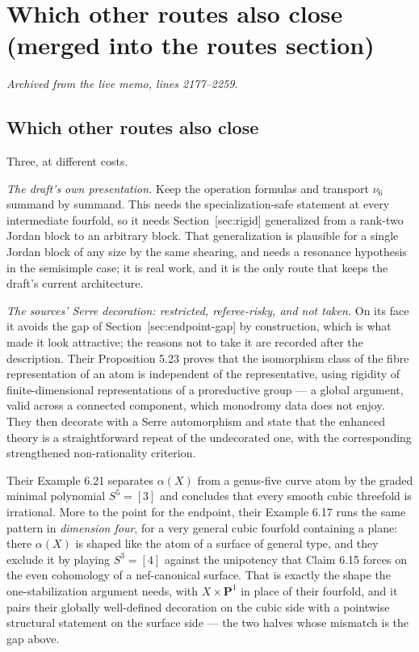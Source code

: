 \documentclass[11pt]{article}
\theoremstyle{definition}
\theoremstyle{remark}
\newcommand{\PP}{\mathbf P}
\begin{document}
\section{Which other routes also close (merged into the routes section)}
\noindent\emph{Archived from the live memo, lines 2177--2259.}

\subsection*{Which other routes also close}

Three, at different costs.

\emph{The draft's own presentation.} Keep the operation formulas and transport
$\nu_6$ summand by summand. This needs the specialization-safe statement at
every intermediate fourfold, so it needs Section~\textup{[sec:rigid]} generalized
from a rank-two Jordan block to an arbitrary block. That generalization is
plausible for a single Jordan block of any size by the same shearing, and needs
a resonance hypothesis in the semisimple case; it is real work, and it is the
only route that keeps the draft's current architecture.

\emph{The sources' Serre decoration: restricted, referee-risky, and not taken.}
On its face it avoids the gap of Section~\textup{[sec:endpoint-gap]} by construction,
which is what made it look attractive; the reasons not to take it are recorded
after the description. Their Proposition 5.23 proves that the
isomorphism class of the fibre representation of an atom is independent of the
representative, using rigidity of finite-dimensional representations of a
proreductive group --- a global argument, valid across a connected component,
which monodromy data does not enjoy. They then decorate with a Serre
automorphism and state that the enhanced theory is a straightforward repeat of
the undecorated one, with the corresponding strengthened non-rationality
criterion.

Their Example 6.21 separates $\alpha(X)$ from a genus-five curve atom by the
graded minimal polynomial $S^5=[3]$ and concludes that every smooth cubic
threefold is irrational. More to the point for the endpoint, their Example 6.17
runs the same pattern in \emph{dimension four}, for a very general cubic
fourfold containing a plane: there $\alpha(X)$ is shaped like the atom of a
surface of general type, and they exclude it by playing $S^3=[4]$ against the
unipotency that Claim 6.15 forces on the even cohomology of a nef-canonical
surface. That is exactly the shape the one-stabilization argument needs, with
$X\times\PP^1$ in place of their fourfold, and it pairs their globally
well-defined decoration on the cubic side with a pointwise structural statement
on the surface side --- the two halves whose mismatch is the gap above.
\end{document}
